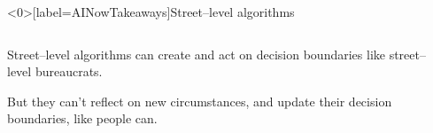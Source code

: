 \documentclass[presentation]{subfiles}
\begin{document}
\begin{frame}<0>[label=AINowTakeaways]{\hspace{1.5em}Street--level algorithms}

\begin{columns}
\begin{column}{0.5\textwidth}
\begin{center}
  \alert{Street--level algorithms} can create and act on decision boundaries like street--level bureaucrats.
  
\vspace{2em}

  But they can't {reflect} on new circumstances, and {update} their decision boundaries, like people can.
  \end{center}
\end{column}


\begin{column}{0.5\textwidth}
\end{column}
\end{columns}


\end{frame}

\end{document}
